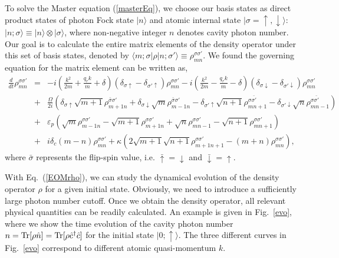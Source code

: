 \documentclass[atoms,article,submit,moreauthors,pdftex,12pt,a4paper]{mdpi}
\def\ba{\begin{eqnarray}}
\def\ea{\end{eqnarray}}
\begin{document}
To solve the Master equation (\ref{masterEq}), we choose our basis states as direct product states of photon Fock state $|n \rangle$ and atomic internal state $|\sigma=\uparrow,\downarrow \rangle$: $|n;\sigma\rangle \equiv |n \rangle \otimes |\sigma \rangle$, %
where non-negative integer $n$ denotes cavity photon number. Our goal is to calculate the entire matrix elements of the density operator under this set of basis states, denoted by $\langle m;\sigma|\rho|n;\sigma'\rangle\equiv\rho_{mn}^{\sigma\sigma'}$. We found the governing equation for the matrix element can be written as,
\ba 
\frac{d}{dt}\rho_{mn}^{\sigma\sigma'} 
& = & -i\left(\frac{{k}^{2}}{2m}+\frac{q_{r}k}{m}+ \delta\right)\left(\delta_{\sigma\uparrow}-\delta_{\sigma'\uparrow}\right)\rho_{mn}^{\sigma\sigma'}
-  i\left(\frac{{k}^{2}}{2m}-\frac{q_{r}k}{m}-\delta\right)\left(\delta_{\sigma\downarrow}-\delta_{\sigma'\downarrow}\right)\rho_{mn}^{\sigma\sigma'}\nonumber\\
& + & \frac{\Omega}{2i}(\delta_{\sigma\uparrow}\sqrt{m+1}\rho_{m+1n}^{\bar{\sigma}\sigma'}
+\delta_{\sigma\downarrow}\sqrt{m}\rho_{m-1n}^{\bar{\sigma}\sigma'}
-\delta_{\sigma'\uparrow}\sqrt{n+1}\rho_{mn+1}^{\sigma\bar{\sigma'}}
-\delta_{\sigma'\downarrow}\sqrt{n}\rho_{mn-1}^{\sigma\bar{\sigma'}})\nonumber\\
& + & \varepsilon_{p}\left(\sqrt{m}\rho_{m-1n}^{\sigma\sigma'}-\sqrt{m+1}\rho_{m+1n}^{\sigma\sigma'}+\sqrt{n}\rho_{mn-1}^{\sigma\sigma'}-\sqrt{n+1}\rho_{mn+1}^{\sigma\sigma'}\right)\nonumber\\
& + & i\delta_{c}\left(m-n\right)\rho_{mn}^{\sigma\sigma'}
+ \kappa\left(2\sqrt{m+1}\sqrt{n+1}\rho_{m+1n+1}^{\sigma\sigma'}-(m+n)\rho_{mn}^{\sigma\sigma'}\right),\label{EOMrho}
\ea
where $\bar{\sigma}$ represents the flip-spin value, i.e. $\bar{\uparrow}=\downarrow$ and $\bar{\downarrow}=\uparrow$. 

With Eq.~(\ref{EOMrho}), we can study the dynamical evolution of the density operator $\rho$ for a given initial state. Obviously, we need to introduce a sufficiently large photon number cutoff. Once we obtain the density operator, all relevant physical quantities can be readily calculated. An example is given in Fig.~\ref{evo}, where we show the time evolution of the cavity photon number $n = {\rm Tr}[\rho \hat{n}]= {\rm Tr}[\rho \hat{c}^\dag \hat{c}]$ for the initial state $|0; \uparrow \rangle$. The three different curves in Fig.~\ref{evo} correspond to different atomic quasi-momentum $k$. 
\end{document}

